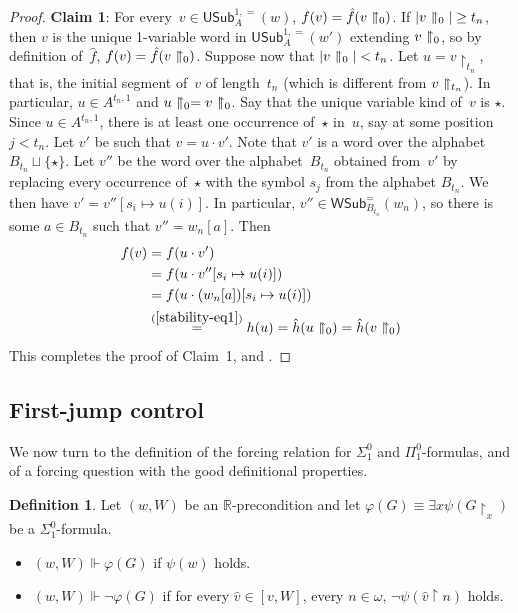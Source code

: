 \documentclass{article}
\def\h{\hat}
\def\uhr{\upharpoonright}
\def\RR{\mathbb{R}}
\newcommand{\uh}{\upharpoonright}
\newcommand{\USub}{\mathsf{USub}}
\newcommand{\WSub}{\mathsf{WSub}}
\numberwithin{theorem}{section}
\theoremstyle{definition}
\newtheorem{definition}[theorem]{Definition}
\newcommand{\upupharpoonright}{%
  \upharpoonright
  \mathrel{\mkern-4.5mu}%
  \upharpoonright
}
\newcommand{\uuh}{\upupharpoonright}
\begin{document}
\begin{proof}
\textbf{Claim 1}: For every~$v \in \USub^{1,=}_{A}(w)$, $f(v) = \hat f(v \uuh_0)$.
If $|v \uuh_0| \geq t_n$, then $v$ is the unique 1-variable word in $\USub^{1,=}_A(w')$ extending $v \uuh_0$, so by definition of~$\hat f$, $f(v) = \hat f(v \uuh_0)$. Suppose now that $|v \uuh_0| < t_n$. Let $u = v \uh_{t_n}$, that is, the initial segment of~$v$ of length~$t_n$ (which is different from $v \uuh_{t_n}$). In particular, $u \in A^{t_n,1}$ and $u \uuh_0 = v \uuh_0$. Say that the unique variable kind of~$v$ is $\star$. Since $u \in A^{t_n,1}$, there is at least one occurrence of~$\star$ in~$u$, say at some position~$j < t_n$. Let $v'$ be such that $v = u \cdot v'$.  Note that $v'$ is a word over the alphabet $B_{t_n} \sqcup \{\star\}$. Let $v''$ be the word over the alphabet~$B_{t_n}$ obtained from~$v'$ by replacing every occurrence of~$\star$ with the symbol $s_j$ from the alphabet $B_{t_n}$. We then have $v' = v''[s_i \mapsto u(i)]$.
In particular, $v'' \in \WSub^=_{B_{t_n}}(w_n)$, so there is some $a \in B_{t_n}$ such that $v'' = w_n[a]$. Then 
\begin{align*}
    f(v) &= f(u \cdot v')\\
        &= f(u \cdot v''[s_i \mapsto u(i)])\\
        &= f(u \cdot (w_n[a])[s_i \mapsto u(i)])\\
        &\overset{(\ref{stability-eq1})}= h(u) = \hat h(u \uuh_0) = \hat h(v \uuh_0)
\end{align*}
This completes the proof of Claim~1, and .
\end{proof}

\subsection{First-jump control}

We now turn to the definition of the forcing relation for $\Sigma^0_1$ and $\Pi^0_1$-formulas,
and of a forcing question with the good definitional properties.

\begin{definition}
Let $(w, W)$ be an $\RR$-precondition and let $\varphi(G) \equiv \exists x \psi(G \uh_x)$ be a $\Sigma^0_1$-formula.
\begin{itemize}
    \item[(1)] $(w, W) \Vdash \varphi(G)$ if $\psi(w)$ holds.
    \item[(2)] $(w, W) \Vdash \neg \varphi(G)$ if
    for every $\h v\in [v,W]$, every $n\in\omega$, $\neg\psi(\h v\uhr n)$ holds.
\end{itemize}
\end{definition}
\end{document}
